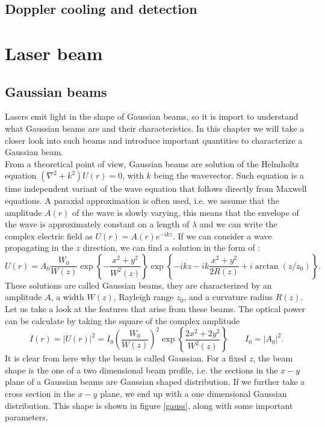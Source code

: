 \subsection{Doppler cooling and detection}
\section{Laser beam}
\subsection{Gaussian beams}
Lasers emit light in the shape of Gaussian beams, so it is import to understand what Gaussian beams are and their characteristics. In this chapter we will take a closer look into such beams and introduce important quantities to characterize a Gaussian beam. \\
From a theoretical point of view, Gaussian beams are solution of the Helmholtz equation $(\nabla^2 + k^2)U(r) = 0$, with $k$ being the wavevector. Such equation is a time independent variant of the wave equation that follows directly from Maxwell equations. A paraxial approximation is often used, i.e.  we assume that the amplitude $A(r)$ of the wave is slowly varying, this means that the envelope of the wave is approximately constant on a length of $\lambda$ and we can write the complex electric field as $U(r) = A(r)e^{-ikz}$. If we can consider a wave propagating in the $z$ direction, we can find a solution in the form of \cite{saleh}:
\begin{equation}
\label{gaussianbeams}
U(r) = A_0 \frac{W_0}{W(z)}\exp\left\{-\frac{x^2+y^2}{W^2(z)}\right\}\exp\left\{-ikz-ik\frac{x^2+y^2}{2R(z)}+i\arctan(z/z_0)\right\}.
\end{equation}
 These solutions are called Gaussian beams, they are characterized by an amplitude $A$, a width $W(z)$, Rayleigh range $z_0$, and a curvature radius $R(z)$. Let us take a look at the features that arise from these beams. The optical power can be calculate by taking the square of the complex amplitude
\begin{equation}
\label{beamintensity}
I(r) = |U(r)|^2 = I_0 \left(\frac{W_0}{W(z)}\right)^2 \exp\left\{\frac{2x^2 + 2y^2}{W^2(z)}\right\}  \qquad I_0 = |A_0|^2.
\end{equation}
It is clear from here why the beam is called Gaussian. For a fixed $z$, the beam shape is the one of a two dimensional beam profile, i.e. the sections in the $x-y$ plane of a Gaussian beams are Gaussian shaped distribution. If we further take a cross section in the $x-y$ plane, we end up with a one dimensional Gaussian distribution. This shape is shown in figure \ref{gauss}, along with some important parameters.
